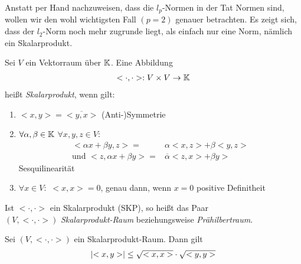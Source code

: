 Anstatt per Hand nachzuweisen, dass die $l_p$-Normen in der Tat Normen sind, 
wollen wir den wohl wichtigsten Fall $(p=2)$ genauer betrachten. Es zeigt sich, 
dass der $l_2$-Norm noch mehr zugrunde liegt, als einfach nur eine Norm, nämlich 
ein Skalarprodukt.

\begin{Definition}{%
	Sei $V$ ein Vektorraum über $\mathbb{K}$. Eine Abbildung 
	\begin{align*}
		< \cdot, \cdot >: V \times V \rightarrow \mathbb{K}
	\end{align*}		
	heißt \emph{Skalarprodukt}, wenn gilt:
	\begin{enumerate}[label=(\subscript{S}{{\arabic*}})]
		\item \label{vl_21_stp_1}$<x,y> = \overline{<y,x>}$ \glqq (Anti-)Symmetrie\grqq{}
		\item \label{vl_21_stp_2} $\forall \alpha,\beta \in \mathbb{K}$ $\forall x,y,z \in V:$
		\begin{align*}
			<\alpha x + \beta y, z > = & \alpha <x,z> + \beta <y,z> \\
			\text{und } <z, \alpha x + \beta y > = &\overline{\alpha} <z,x> 
				+ \beta y >
		\end{align*}
		\glqq Sesquilinearität\grqq{}
		\item \label{vl_21_stp_3} $\forall x \in V:$ $<x,x> = 0$, genau dann, wenn $x = 0$
		\glqq positive Definitheit\grqq{}
	\end{enumerate}
	Ist $<\cdot, \cdot>$ ein Skalarprodukt (SKP), so heißt das Paar \\
	$(V, <\cdot,\cdot>)$ \emph{Skalarprodukt-Raum} beziehungsweise 
	\emph{Prähilbertraum}.
}\end{Definition}

\begin{Lemma}{%
	Sei $(V, <\cdot,\cdot>)$ ein Skalarprodukt-Raum. Dann gilt
	\begin{align*}
		\abs{<x,y>} \leq \sqrt{<x,x>} \cdot \sqrt{<y,y>}
	\end{align*}
}\end{Lemma}

